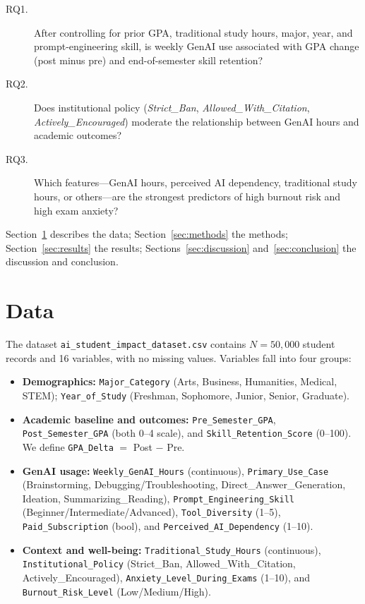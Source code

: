 \documentclass[11pt]{article}
\begin{document}
\begin{description}
\item[RQ1.] After controlling for prior GPA, traditional study hours, major,
year, and prompt-engineering skill, is weekly GenAI use associated with GPA
change (post minus pre) and end-of-semester skill retention?
\item[RQ2.] Does institutional policy
(\emph{Strict\_Ban}, \emph{Allowed\_With\_Citation},
\emph{Actively\_Encouraged}) moderate the relationship between GenAI hours and
academic outcomes?
\item[RQ3.] Which features---GenAI hours, perceived AI dependency,
traditional study hours, or others---are the strongest predictors of high
burnout risk and high exam anxiety?
\end{description}

Section~\ref{sec:data} describes the data; Section~\ref{sec:methods} the
methods; Section~\ref{sec:results} the results; Sections~\ref{sec:discussion}
and~\ref{sec:conclusion} the discussion and conclusion.

\section{Data}
\label{sec:data}

The dataset \texttt{ai\_student\_impact\_dataset.csv} contains $N=50{,}000$
student records and 16 variables, with no missing values. Variables fall into
four groups:

\begin{itemize}
\item \textbf{Demographics:} \texttt{Major\_Category}
(Arts, Business, Humanities, Medical, STEM); \texttt{Year\_of\_Study}
(Freshman, Sophomore, Junior, Senior, Graduate).
\item \textbf{Academic baseline and outcomes:} \texttt{Pre\_Semester\_GPA},
\texttt{Post\_Semester\_GPA} (both 0--4 scale), and
\texttt{Skill\_Retention\_Score} (0--100). We define
\texttt{GPA\_Delta} $=$ Post $-$ Pre.
\item \textbf{GenAI usage:} \texttt{Weekly\_GenAI\_Hours}
(continuous), \texttt{Primary\_Use\_Case} (Brainstorming,
Debugging/Troubleshooting, Direct\_Answer\_Generation, Ideation,
Summarizing\_Reading), \texttt{Prompt\_Engineering\_Skill}
(Beginner/Intermediate/Advanced), \texttt{Tool\_Diversity} (1--5),
\texttt{Paid\_Subscription} (bool), and \texttt{Perceived\_AI\_Dependency}
(1--10).
\item \textbf{Context and well-being:} \texttt{Traditional\_Study\_Hours}
(continuous), \texttt{Institutional\_Policy} (Strict\_Ban,
Allowed\_With\_Citation, Actively\_Encouraged),
\texttt{Anxiety\_Level\_During\_Exams} (1--10), and
\texttt{Burnout\_Risk\_Level} (Low/Medium/High).
\end{itemize}
\end{document}
